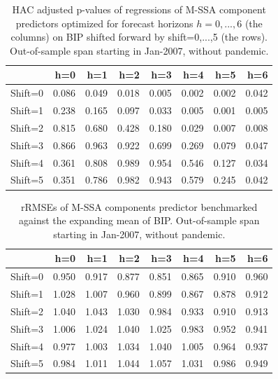 \documentclass[a4paper]{article}
\begin{document}

\begin{table}[ht]
\centering
\begin{tabular}{rrrrrrrr}
  \hline
 & h=0 & h=1 & h=2 & h=3 & h=4 & h=5 & h=6 \\ 
  \hline
Shift=0 & 0.086 & 0.049 & 0.018 & 0.005 & 0.002 & 0.002 & 0.042 \\ 
  Shift=1 & 0.238 & 0.165 & 0.097 & 0.033 & 0.005 & 0.001 & 0.005 \\ 
  Shift=2 & 0.815 & 0.680 & 0.428 & 0.180 & 0.029 & 0.007 & 0.008 \\ 
  Shift=3 & 0.866 & 0.963 & 0.922 & 0.699 & 0.269 & 0.079 & 0.047 \\ 
  Shift=4 & 0.361 & 0.808 & 0.989 & 0.954 & 0.546 & 0.127 & 0.034 \\ 
  Shift=5 & 0.351 & 0.786 & 0.982 & 0.943 & 0.579 & 0.245 & 0.042 \\ 
   \hline
\end{tabular}
\caption{HAC adjusted p-values of regressions of M-SSA component predictors optimized for forecast horizons $h=0,...,6$  (the columns) on BIP shifted forward by shift=0,...,5 (the rows). Out-of-sample span starting in Jan-2007, without pandemic.} 
\label{p_val_wc}
\end{table}%
\begin{table}[ht]
\centering
\begin{tabular}{rrrrrrrr}
  \hline
 & h=0 & h=1 & h=2 & h=3 & h=4 & h=5 & h=6 \\ 
  \hline
Shift=0 & 0.950 & 0.917 & 0.877 & 0.851 & 0.865 & 0.910 & 0.960 \\ 
  Shift=1 & 1.028 & 1.007 & 0.960 & 0.899 & 0.867 & 0.878 & 0.912 \\ 
  Shift=2 & 1.040 & 1.043 & 1.030 & 0.984 & 0.933 & 0.910 & 0.913 \\ 
  Shift=3 & 1.006 & 1.024 & 1.040 & 1.025 & 0.983 & 0.952 & 0.941 \\ 
  Shift=4 & 0.977 & 1.003 & 1.034 & 1.040 & 1.005 & 0.964 & 0.937 \\ 
  Shift=5 & 0.984 & 1.011 & 1.044 & 1.057 & 1.031 & 0.986 & 0.949 \\ 
   \hline
\end{tabular}
\caption{rRMSEs of M-SSA components predictor benchmarked against the expanding mean of BIP. Out-of-sample span starting in Jan-2007, without pandemic.} 
\label{rRMSE_mSSA_comp_mean_wc}
\end{table}
\end{document}
